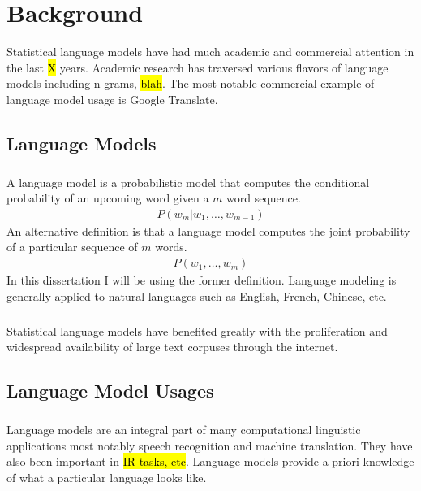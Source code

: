 \chapter{Background}
Statistical language models have had much academic and commercial attention in the last \hl{X} years. Academic research has traversed various flavors of language models including n-grams, \hl{blah}. The most notable commercial example of language model usage is Google Translate. 

\section{Language Models}
\paragraph{}
A language model is a probabilistic model that computes the conditional probability of an upcoming word given a $m$ word sequence. 
\begin{align}
P(w_m | w_1,\dots, w_{m-1})
\end{align}
An alternative definition is that a language model computes the joint probability of a particular sequence of  $m$ words. 
\begin{align}
P(w_1, \dots ,w_m)
\end{align}
In this dissertation I will be using the former definition. Language modeling is generally applied to natural languages such as English, French, Chinese, etc. 
\paragraph{}
Statistical language models have benefited greatly with the proliferation and widespread availability of large text corpuses through the internet. 
\paragraph{}

\section{Language Model Usages}
\paragraph{}
Language models are an integral part of many computational linguistic applications most notably speech recognition and machine translation. They have also been important in \hl{IR tasks, etc}. Language models provide a priori knowledge of what a particular language looks like. 

